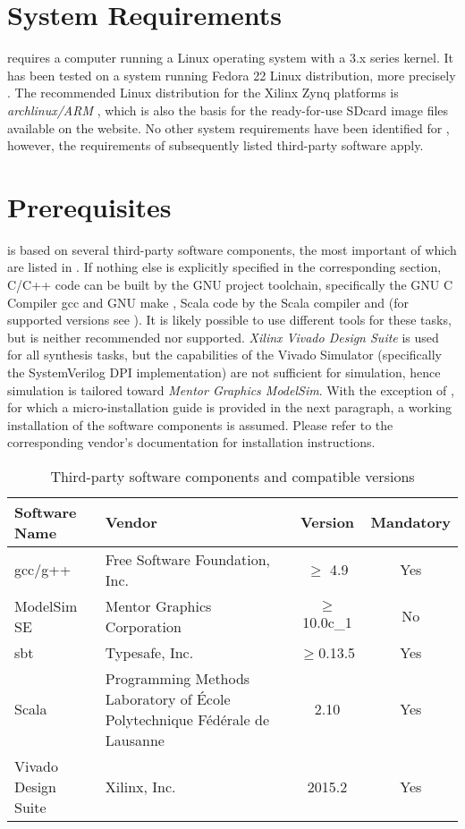 \section{System Requirements}
\tapasco{} requires a computer running a \textsf{Linux} operating system with a 3.x series kernel.
It has been tested on a system running Fedora 22 Linux distribution, more precisely .
The recommended Linux distribution for the Xilinx Zynq platforms is \emph{archlinux/ARM} \cite{archlinuxarm}, which is also the basis for the ready-for-use SDcard image files available on the \tapasco{} website.
No other system requirements have been identified for \tapasco{}, however, the requirements of subsequently listed third-party software apply.

\section{Prerequisites}
\tapasco{} is based on several third-party software components, the most important of which are listed in .
If nothing else is explicitly specified in the corresponding section, C/C++ code can be built by the GNU project toolchain, specifically the GNU C Compiler gcc \cite{gcc} and GNU make \cite{gmake}, Scala code by the Scala compiler \cite{scala} and  \cite{sbt} (for supported versions see ).
It is likely possible to use different tools for these tasks, but is neither recommended nor supported.
\emph{Xilinx Vivado Design Suite} is used for all synthesis tasks, but the capabilities of the Vivado Simulator (specifically the SystemVerilog DPI implementation) are not sufficient for simulation, hence simulation is tailored toward \emph{Mentor Graphics ModelSim}.
With the exception of , for which a micro-installation guide is provided in the next paragraph, a working installation of the software components is assumed.
Please refer to the corresponding vendor's documentation for installation instructions.

\begin{longtable}[c]{llcc}
  \caption{Third-party software components and compatible versions}
  \label{tbl:thirdparty}\\
  \toprule
  \textbf{Software Name} & \textbf{Vendor} & \textbf{Version} & \textbf{Mandatory}\\\midrule
  \endhead
  \bottomrule
  \endlastfoot
  gcc/g++ & Free Software Foundation, Inc. & $\geq$ 4.9 & Yes\\\midrule
  ModelSim SE & Mentor Graphics Corporation & $\geq$ 10.0c\_1 & No\\\midrule
  sbt & Typesafe, Inc. & $\geq$0.13.5 & Yes\\\midrule
  Scala & \begin{minipage}{5cm}Programming Methods Laboratory of École Polytechnique Fédérale de Lausanne\end{minipage} & 2.10 & Yes\\\midrule
  Vivado Design Suite & Xilinx, Inc. & 2015.2 & Yes\\
\end{longtable}

